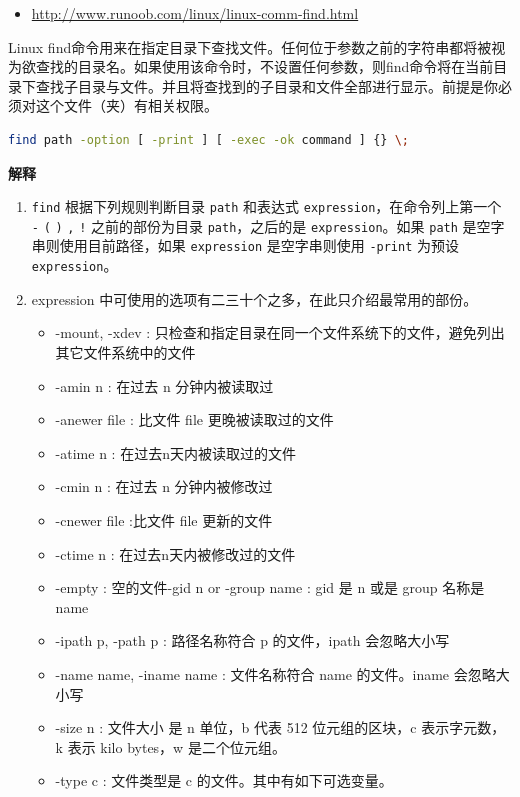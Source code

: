 \documentclass[doctor,openright,twoside]{sjtuthesis}
\providecommand{\tightlist}{%
    \setlength{\itemsep}{0pt}\setlength{\parskip}{0pt}}
\newcommand{\passthrough}[1]{#1}
\theoremstyle{plain}
\theoremstyle{definition}
\theoremstyle{remark}
\theoremstyle{ocrenumbox}
\theoremstyle{plain}
\begin{document}
\begin{itemize}
\tightlist
\item
  \url{http://www.runoob.com/linux/linux-comm-find.html}
\end{itemize}

Linux
find命令用来在指定目录下查找文件。任何位于参数之前的字符串都将被视为欲查找的目录名。如果使用该命令时，不设置任何参数，则find命令将在当前目录下查找子目录与文件。并且将查找到的子目录和文件全部进行显示。前提是你必须对这个文件（夹）有相关权限。

\begin{lstlisting}[language=bash]
find path -option [ -print ] [ -exec -ok command ] {} \;
\end{lstlisting}

\textbf{解释}

\begin{enumerate}
\def\labelenumi{\arabic{enumi}.}
\tightlist
\item
  \passthrough{\lstinline!find!} 根据下列规则判断目录
  \passthrough{\lstinline!path!} 和表达式
  \passthrough{\lstinline!expression!}，在命令列上第一个
  \passthrough{\lstinline!-!} \passthrough{\lstinline!(!}
  \passthrough{\lstinline!)!} \passthrough{\lstinline!,!}
  \passthrough{\lstinline"!"} 之前的部份为目录
  \passthrough{\lstinline!path!}，之后的是
  \passthrough{\lstinline!expression!}。如果
  \passthrough{\lstinline!path!} 是空字串则使用目前路径，如果
  \passthrough{\lstinline!expression!} 是空字串则使用
  \passthrough{\lstinline!-print!} 为预设
  \passthrough{\lstinline!expression!}。
\item
  expression 中可使用的选项有二三十个之多，在此只介绍最常用的部份。

  \begin{itemize}
  \tightlist
  \item
    -mount, -xdev :
    只检查和指定目录在同一个文件系统下的文件，避免列出其它文件系统中的文件
  \item
    -amin n : 在过去 n 分钟内被读取过
  \item
    -anewer file : 比文件 file 更晚被读取过的文件
  \item
    -atime n : 在过去n天内被读取过的文件
  \item
    -cmin n : 在过去 n 分钟内被修改过
  \item
    -cnewer file :比文件 file 更新的文件
  \item
    -ctime n : 在过去n天内被修改过的文件
  \item
    -empty : 空的文件-gid n or -group name : gid 是 n 或是 group 名称是
    name
  \item
    -ipath p, -path p : 路径名称符合 p 的文件，ipath 会忽略大小写
  \item
    -name name, -iname name : 文件名称符合 name 的文件。iname
    会忽略大小写
  \item
    -size n : 文件大小 是 n 单位，b 代表 512 位元组的区块，c
    表示字元数，k 表示 kilo bytes，w 是二个位元组。
  \item
    -type c : 文件类型是 c 的文件。其中有如下可选变量。


\end{itemize}
\end{enumerate}
\end{document}

